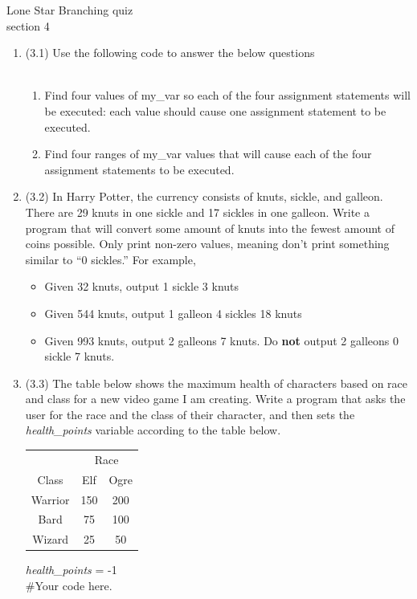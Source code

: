 \documentclass{article}
\begin{document}

Lone Star \hfill Branching quiz\\
section 4\\
\begin{enumerate}
\item (3.1)  
		Use the following code to answer the below questions\\
		\mbox{ \hspace*{0.25in}	}
		\begin{enumerate}
			\item Find four values of my\_var so each of the four assignment statements will be executed: 
				each value should cause one assignment statement to be executed.
			\item Find four ranges of my\_var values that will cause each of the four assignment 
				statements to be executed.
		\end{enumerate}


\item (3.2)  
		In Harry Potter, the currency consists of knuts, sickle, and galleon.  There are 29 knuts in 
		one sickle and 17 sickles in one galleon.  Write a program that will convert some amount of 
		knuts into the fewest amount of coins possible.  Only print non-zero values, meaning don't 
		print something similar to ``0 sickles.''  For example,
		\begin{itemize}
			\item Given 32 knuts, output 1 sickle 3 knuts
			\item Given 544 knuts, output 1 galleon 4 sickles 18 knuts
			\item Given 993 knuts, output 2 galleons 7 knuts. 
				Do \textbf{not} output 2 galleons 0 sickle 7 knuts.
		\end{itemize}




\item (3.3)  
		The table below shows the maximum health of characters based on race and class for a new 
		video game I am creating.  Write a program that asks the user for the race and the class of 
		their character, and then sets the \textit{health\_points}	variable according to the table 
		below.
		\begin{flushright}
		\begin{tabular}{c|cc}
			& \multicolumn{2}{c}{Race}\\
			Class & Elf & Ogre \\ \hline
			Warrior & 150 & 200\\
			Bard & 75 & 100\\
			Wizard & 25 & 50 \\
		\end{tabular}
		\end{flushright}
		
		\vspace*{-6em}
		\textit{health\_points} = -1\\
		\#Your code here.
		\vspace*{3em}





\end{enumerate}
\end{document}
